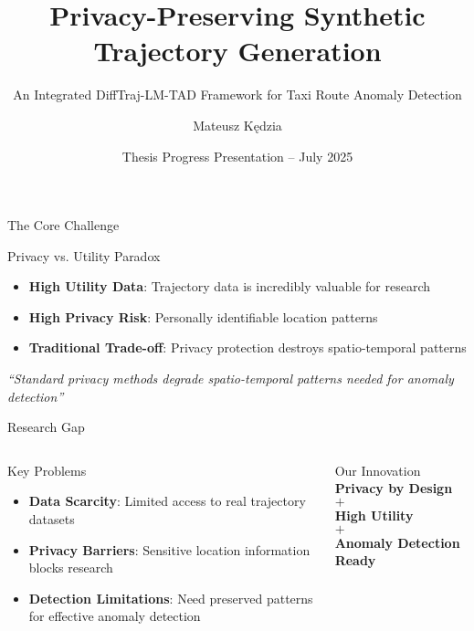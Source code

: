 \documentclass[aspectratio=169,xcolor={dvipsnames}]{beamer}
\title{Privacy-Preserving Synthetic Trajectory Generation}
\subtitle{An Integrated DiffTraj-LM-TAD Framework for Taxi Route Anomaly Detection}
\author{Mateusz Kędzia}
\institute{MSc Artificial Intelligence \\ Vrije Universiteit Amsterdam}
\date{Thesis Progress Presentation -- July 2025}
\newcommand{\highlight}[1]{\textcolor{VUOrange}{\textbf{#1}}}
\begin{document}
\begin{frame}
  \titlepage
\end{frame}

\begin{frame}{The Core Challenge}
  \begin{alertblock}{Privacy vs. Utility Paradox}
    \begin{itemize}
      \item \highlight{High Utility Data}: Trajectory data is incredibly valuable for research
      \item \highlight{High Privacy Risk}: Personally identifiable location patterns
      \item \highlight{Traditional Trade-off}: Privacy protection destroys spatio-temporal patterns
    \end{itemize}
  \end{alertblock}
  
  \vspace{1em}
  \begin{center}
    \large\textit{``Standard privacy methods degrade spatio-temporal patterns needed for anomaly detection''}
  \end{center}
\end{frame}

\begin{frame}{Research Gap}
  \begin{columns}
    \begin{column}{0.5\textwidth}
      \begin{block}{Key Problems}
        \begin{itemize}
          \item \textbf{Data Scarcity}: Limited access to real trajectory datasets
          \item \textbf{Privacy Barriers}: Sensitive location information blocks research
          \item \textbf{Detection Limitations}: Need preserved patterns for effective anomaly detection
        \end{itemize}
      \end{block}
    \end{column}
    \begin{column}{0.5\textwidth}
      \begin{alertblock}{Our Innovation}
        \centering
        \textbf{Privacy by Design} \\
        $+$ \\
        \textbf{High Utility} \\
        $+$ \\
        \textbf{Anomaly Detection Ready}
      \end{alertblock}
    \end{column}
  \end{columns}
\end{frame}
\end{document}
